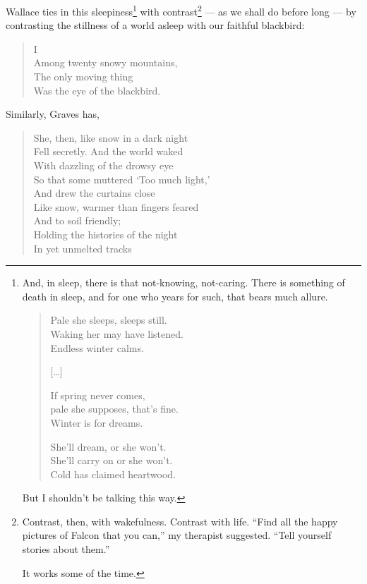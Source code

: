 \documentclass[12pt]{memoir}
\begin{document}
Wallace ties in this sleepiness\footnote{And, in sleep, there is that not-knowing, not-caring. There is something of death in sleep, and for one who years for such, that bears much allure.\begin{verse}
Pale she sleeps, sleeps still. \\
Waking her may have listened. \\
Endless winter calms. \par
{[\ldots]} \par
If spring never comes, \\
pale she supposes, that's fine. \\
Winter is for dreams. \par
She'll dream, or she won't. \\
She'll carry on or she won't. \\
Cold has claimed heartwood. \par
\parencite{pale_she}
\end{verse}\par But I shouldn't be talking this way.} with contrast\footnote{Contrast, then, with wakefulness. Contrast with life. ``Find all the happy pictures of Falcon that you can,'' my therapist suggested. ``Tell yourself stories about them.''\par It works some of the time.} --- as we shall do before long --- by contrasting the stillness of a world asleep with our faithful blackbird:

\begin{verse}
I \\
Among twenty snowy mountains, \\
The only moving thing \\
Was the eye of the blackbird.

\parencite{blackbird}
\end{verse}

Similarly, Graves has,

\begin{verse}
She, then, like snow in a dark night \\
Fell secretly. And the world waked \\
With dazzling of the drowsy eye \\
So that some muttered `Too much light,' \\
And drew the curtains close \\
Like snow, warmer than fingers feared \\
And to soil friendly; \\
Holding the histories of the night \\
In yet unmelted tracks

\parencite[143]{graves_poems}
\end{verse}
\end{document}
